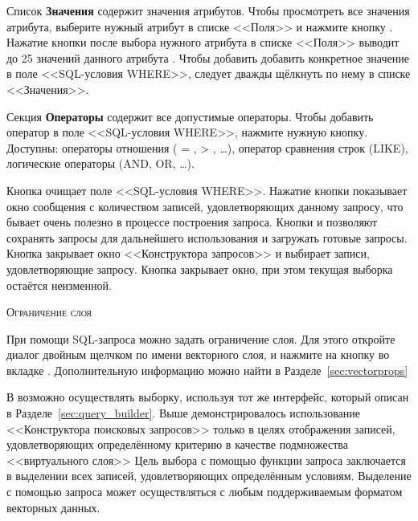 Список \textbf{Значения} содержит значения атрибутов. Чтобы просмотреть все
значения атрибута, выберите нужный атрибут в списке <<Поля>> и нажмите кнопку
 . Нажатие кнопки
 после выбора нужного атрибута в списке <<Поля>> выводит
до 25 значений данного атрибута .
Чтобы добавить добавить конкретное значение в поле <<SQL-условия WHERE>>,
следует дважды щёлкнуть по нему в списке <<Значения>>.

Секция \textbf{Операторы} содержит все допустимые операторы. Чтобы добавить
оператор в поле <<SQL-условия WHERE>>, нажмите нужную кнопку. Доступны:
операторы отношения ( = , > , \ldots), оператор сравнения строк (LIKE),
логические операторы (AND, OR, \ldots).

Кнопка  очищает поле <<SQL-условия WHERE>>. Нажатие кнопки
 показывает окно сообщения с количеством записей,
удовлетворяющих данному запросу, что бывает очень полезно в процессе
построения запроса. Кнопки  и  позволяют
сохранять запросы для дальнейшего использования и загружать готовые запросы.
Кнопка  закрывает окно <<Конструктора запросов>> и выбирает
записи, удовлетворяющие запросу. Кнопка  закрывает окно,
при этом текущая выборка остаётся неизменной.

\begin{Tip}\caption{\textsc{Ограничение слоя}}
При помощи SQL-запроса можно задать ограничение слоя. Для этого откройте
диалог  двойным щелчком по имени векторного слоя,
и нажмите на кнопку  во вкладке .
Дополнительную информацию можно найти в Разделе~\ref{sec:vectorprops}
\end{Tip}

\label{sec:select_by_query}

В \qg возможно осуществлять выборку, используя тот же интерфейс,
который описан в Разделе~\ref{sec:query_builder}. Выше демонстрировалось
использование <<Конструктора поисковых запросов>> только в целях отображения
записей, удовлетворяющих определённому критерию в качестве подмножества
<<виртуального слоя>> Цель выбора с помощью функции запроса заключается
в выделении всех записей, удовлетворяющих определённым условиям. Выделение
с помощью запроса может осуществляться с любым поддерживаемым форматом
векторных данных.

